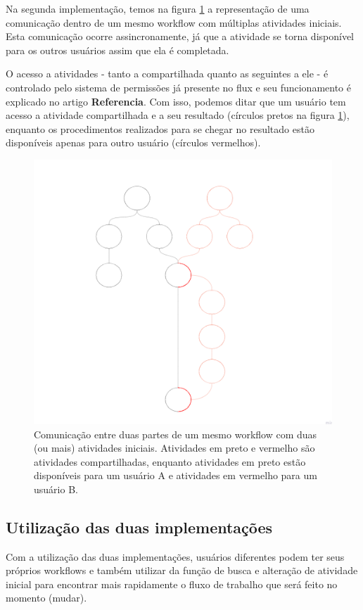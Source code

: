 Na segunda implementação, temos na figura \ref{fig:segunda_implementacao} a representação de uma comunicação dentro de um mesmo workflow com múltiplas atividades iniciais. Esta comunicação ocorre assincronamente, já que a atividade se torna disponível para os outros usuários assim que ela é completada.

O acesso a atividades - tanto a compartilhada quanto as seguintes a ele - é controlado pelo sistema de permissões já presente no flux e seu funcionamento é explicado no artigo \textbf{Referencia}. Com isso, podemos ditar que um usuário tem acesso a atividade compartilhada e a seu resultado (círculos pretos na figura \ref{fig:segunda_implementacao}), enquanto os procedimentos realizados para se chegar no resultado estão disponíveis apenas para outro usuário (círculos vermelhos).

\begin{figure}
    \centering
    \includegraphics[width=1\textwidth]{imgs/Implementacoes/segundaImplementacao.png}
    \caption{Comunicação entre duas partes de um mesmo workflow com duas (ou mais) atividades iniciais. Atividades em preto e vermelho são atividades compartilhadas, enquanto atividades em preto estão disponíveis para um usuário A e atividades em vermelho para um usuário B.}
    \label{fig:segunda_implementacao}
\end{figure}

\subsection{Utilização das duas implementações}

Com a utilização das duas implementações, usuários diferentes podem ter seus próprios workflows e também utilizar da função de busca e alteração de atividade inicial para encontrar mais rapidamente o fluxo de trabalho que será feito no momento (mudar).

